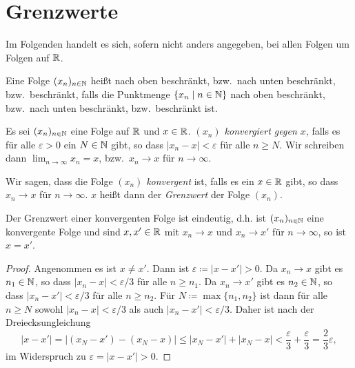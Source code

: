 \documentclass[a4paper,10pt]{article}
\begin{document}
\section{Grenzwerte}
Im Folgenden handelt es sich, sofern nicht anders angegeben, bei allen Folgen um Folgen auf $\mathbb{R}$.


\begin{defi}
 Eine Folge $(x_n)_{n \in \mathbb{N}}$ heißt nach oben beschränkt, bzw.\ nach unten beschränkt, bzw.\ beschränkt, falls die Punktmenge $\{x_n \mid n \in \mathbb{N}\}$ nach oben beschränkt, bzw.\ nach unten beschränkt, bzw.\ beschränkt ist.
\end{defi}


\begin{defi}
 Es sei $(x_n)_{n \in \mathbb{N}}$ eine Folge auf $\mathbb{R}$ und $x \in \mathbb{R}$. \emph{$(x_n)$ konvergiert gegen $x$}, falls es für alle $\varepsilon > 0$ ein $N \in \mathbb{N}$ gibt, so dass $|x_n-x| < \varepsilon$ für alle $n \geq N$. Wir schreiben dann $\lim_{n \to \infty} x_n = x$, bzw.\ $x_n \to x$ für $n \to \infty$.
 
 Wir sagen, dass die Folge $(x_n)$ \emph{konvergent} ist, falls es ein $x \in \mathbb{R}$ gibt, so dass $x_n \to x$ für $n \to \infty$. $x$ heißt dann der \emph{Grenzwert} der Folge $(x_n)$.
\end{defi}


\begin{prop}
 Der Grenzwert einer konvergenten Folge ist eindeutig, d.h. ist $(x_n)_{n \in \mathbb{N}}$ eine konvergente Folge und sind $x, x' \in \mathbb{R}$ mit $x_n \to x$ und $x_n \to x'$ für $n \to \infty$, so ist $x = x'$.
\end{prop}
\begin{proof}
 Angenommen es ist $x \neq x'$. Dann ist $\varepsilon \coloneqq |x-x'| > 0$. Da $x_n \to x$ gibt es $n_1 \in \mathbb{N}$, so dass $|x_n - x| < \varepsilon/3$ für alle $n \geq n_1$. Da $x_n \to x'$ gibt es $n_2 \in \mathbb{N}$, so dass $|x_n - x'| < \varepsilon/3$ für alle $n \geq n_2$. Für $N \coloneqq \max \{n_1, n_2\}$ ist dann für alle $n \geq N$ sowohl $|x_n - x| < \varepsilon/3$ als auch $|x_n - x'| < \varepsilon/3$. Daher ist nach der Dreiecksungleichung
 \[
  |x - x'|
  = |(x_N - x') - (x_N - x)|
  \leq |x_N - x'| + |x_N - x|
  < \frac{\varepsilon}{3} + \frac{\varepsilon}{3}
  = \frac{2}{3} \varepsilon,
 \]
 im Widerspruch zu $\varepsilon = |x - x'| > 0$.
\end{proof}
\end{document}
